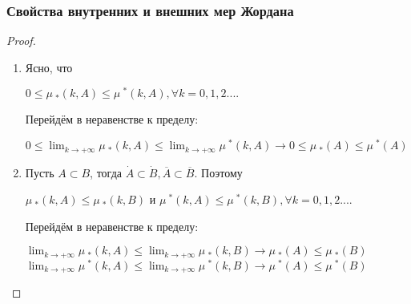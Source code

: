 \documentclass{beamer}
\newcounter{saveenumerate}
\newcommand{\saveenumerate}{\setcounter{saveenumerate}{\value{enumi}}}
\begin{document}
\begin{frame}
\frametitle{Свойства внутренних и внешних мер Жордана}
	\begin{proof}
	\begin{enumerate}[<+->]
	\item Ясно, что
	\begin{center}
	$0 \leq \mu\ _*(k, A) \leq \mu\ ^*(k, A), \forall k = 0,1,2... .$
	\end{center}
	Перейдём в неравенстве к пределу:
	\begin{center}
	$0 \leq \lim_{k \to + \infty }\mu\ _*(k, A) \leq \lim_{k \to + \infty } \mu\ ^*(k, A) \rightarrow 0 \leq \mu\ _*(A) \leq \mu\ ^*(A)$
	\end{center}
	\item Пусть $A \subset B$, тогда $\dot{A} \subset \dot{B}, \overline{A} \subset \overline{B}$. Поэтому 
	\begin{center}
	$\mu\ _*(k, A) \leq \mu\ _*(k, B)$ и $\mu\ ^*(k, A) \leq \mu\ ^*(k, B), \forall k = 0,1,2...  $.
	\end{center}
	 Перейдём в неравенстве к пределу:
	\begin{center}
	$\lim_{k \to + \infty }\mu\ _*(k, A) \leq \lim_{k \to + \infty } \mu\ _*(k, B) \rightarrow \mu\ _*(A) \leq \mu\ _*(B)$
	$\lim_{k \to + \infty }\mu\ ^*(k, A) \leq \lim_{k \to + \infty } \mu\ ^*(k, B) \rightarrow \mu\ ^*(A) \leq \mu\ ^*(B)$
	\end{center}
	\saveenumerate
	\end{enumerate}
	\end{proof}
\end{frame}
\end{document}
